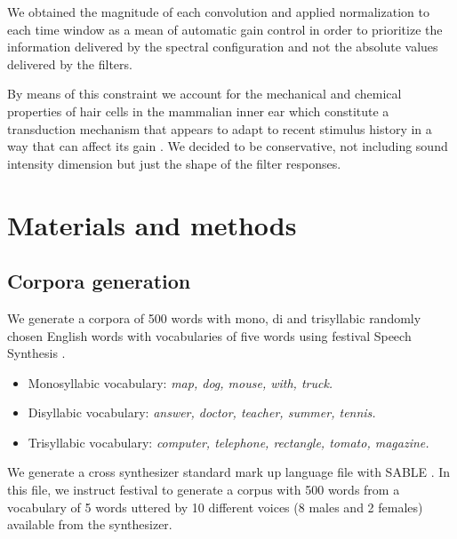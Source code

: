 \documentclass[10pt,letterpaper]{article}
\begin{document}
We obtained the magnitude of each convolution and applied normalization to each time window
as a mean of automatic gain control in order to prioritize the information delivered by the
spectral configuration and not the absolute values delivered by the filters. 

By means of this constraint we account for the mechanical and chemical properties of hair cells in the mammalian inner ear
which constitute a transduction mechanism that appears to adapt to recent stimulus history in a way that can affect its gain
\cite{eatock_2000,holt_2000,le_goff_2005}. 
We decided to be conservative, not including
sound intensity dimension but just the shape of the filter responses.














\section*{Materials and methods}
\subsection*{Corpora generation}
\label{CorpGen}


We generate a corpora of 500 words with mono, di and trisyllabic randomly chosen English words with vocabularies of five words
using \gls{festival} Speech Synthesis \cite{festival2014}.

\begin{itemize}
	\item Monosyllabic vocabulary: \textit{map, dog, mouse, with, truck.} %
	\item Disyllabic vocabulary: \textit{answer, doctor, teacher, summer, tennis.}  %
	\item Trisyllabic vocabulary: \textit{computer, telephone, rectangle, tomato, magazine.} %
\end{itemize}


We generate a cross synthesizer standard mark up language file with SABLE \cite{sable}.
In this file, we instruct \gls{festival} to generate a corpus with 500 words from a vocabulary of
5 words uttered by 10 different voices (8 males and 2 females) available from the synthesizer.
\end{document}
